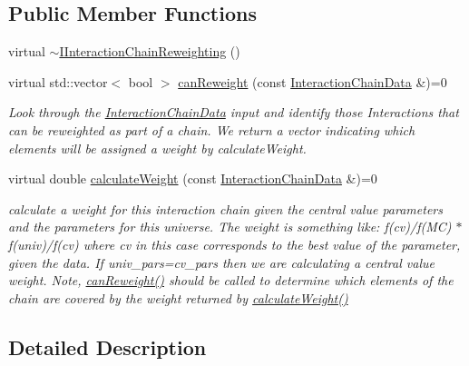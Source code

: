 \subsection*{Public Member Functions}
\begin{DoxyCompactItemize}
\item 
virtual \hyperlink{class_neutrino_flux_reweight_1_1_i_interaction_chain_reweighting_a7b521fb6a2f592399446228bd914e94c}{$\sim$\-I\-Interaction\-Chain\-Reweighting} ()
\item 
virtual std\-::vector$<$ bool $>$ \hyperlink{class_neutrino_flux_reweight_1_1_i_interaction_chain_reweighting_aacf17580c1d316f0ebcdfdff7418e9e3}{can\-Reweight} (const \hyperlink{class_neutrino_flux_reweight_1_1_interaction_chain_data}{Interaction\-Chain\-Data} \&)=0
\begin{DoxyCompactList}\small\item\em Look through the \hyperlink{class_neutrino_flux_reweight_1_1_interaction_chain_data}{Interaction\-Chain\-Data} input and identify those Interactions that can be reweighted as part of a chain. We return a vector indicating which elements will be assigned a weight by calculate\-Weight. \end{DoxyCompactList}\item 
virtual double \hyperlink{class_neutrino_flux_reweight_1_1_i_interaction_chain_reweighting_ae28403553637013fdc720674ee24c7c5}{calculate\-Weight} (const \hyperlink{class_neutrino_flux_reweight_1_1_interaction_chain_data}{Interaction\-Chain\-Data} \&)=0
\begin{DoxyCompactList}\small\item\em calculate a weight for this interaction chain given the central value parameters and the parameters for this universe. The weight is something like\-: f(cv)/f(M\-C) $\ast$ f(univ)/f(cv) where cv in this case corresponds to the best value of the parameter, given the data. If univ\-\_\-pars=cv\-\_\-pars then we are calculating a central value weight. Note, \hyperlink{class_neutrino_flux_reweight_1_1_i_interaction_chain_reweighting_aacf17580c1d316f0ebcdfdff7418e9e3}{can\-Reweight()} should be called to determine which elements of the chain are covered by the weight returned by \hyperlink{class_neutrino_flux_reweight_1_1_i_interaction_chain_reweighting_ae28403553637013fdc720674ee24c7c5}{calculate\-Weight()} \end{DoxyCompactList}\end{DoxyCompactItemize}


\subsection{Detailed Description}


